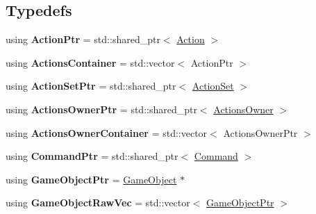 \subsection*{Typedefs}
\begin{DoxyCompactItemize}
\item 
\hypertarget{namespaceDCEngine_afb966e132a34bf8f735f7382592117c1}{using {\bfseries Action\-Ptr} = std\-::shared\-\_\-ptr$<$ \hyperlink{classDCEngine_1_1Action}{Action} $>$}\label{namespaceDCEngine_afb966e132a34bf8f735f7382592117c1}

\item 
\hypertarget{namespaceDCEngine_a185d16db9db10ab7dcc13f235b6084b6}{using {\bfseries Actions\-Container} = std\-::vector$<$ Action\-Ptr $>$}\label{namespaceDCEngine_a185d16db9db10ab7dcc13f235b6084b6}

\item 
\hypertarget{namespaceDCEngine_a0d17ef7ea7367db86a884ce6a80bd3d4}{using {\bfseries Action\-Set\-Ptr} = std\-::shared\-\_\-ptr$<$ \hyperlink{classDCEngine_1_1ActionSet}{Action\-Set} $>$}\label{namespaceDCEngine_a0d17ef7ea7367db86a884ce6a80bd3d4}

\item 
\hypertarget{namespaceDCEngine_a844aaea0b902e67d8a52ee87c6fd46af}{using {\bfseries Actions\-Owner\-Ptr} = std\-::shared\-\_\-ptr$<$ \hyperlink{classDCEngine_1_1ActionsOwner}{Actions\-Owner} $>$}\label{namespaceDCEngine_a844aaea0b902e67d8a52ee87c6fd46af}

\item 
\hypertarget{namespaceDCEngine_ac039be23ffd8c568541fa61a2f0a615e}{using {\bfseries Actions\-Owner\-Container} = std\-::vector$<$ Actions\-Owner\-Ptr $>$}\label{namespaceDCEngine_ac039be23ffd8c568541fa61a2f0a615e}

\item 
\hypertarget{namespaceDCEngine_a0b369931802e2018ee1f083dd2ea426c}{using {\bfseries Command\-Ptr} = std\-::shared\-\_\-ptr$<$ \hyperlink{classDCEngine_1_1Command}{Command} $>$}\label{namespaceDCEngine_a0b369931802e2018ee1f083dd2ea426c}

\item 
\hypertarget{namespaceDCEngine_a79a8be802832f343d6b0ae7178f6b5a7}{using {\bfseries Game\-Object\-Ptr} = \hyperlink{classDCEngine_1_1GameObject}{Game\-Object} $\ast$}\label{namespaceDCEngine_a79a8be802832f343d6b0ae7178f6b5a7}

\item 
\hypertarget{namespaceDCEngine_a543d3c0e1e3db988bd5c48c1e12f5ad9}{using {\bfseries Game\-Object\-Raw\-Vec} = std\-::vector$<$ \hyperlink{classDCEngine_1_1GameObject}{Game\-Object\-Ptr} $>$}\label{namespaceDCEngine_a543d3c0e1e3db988bd5c48c1e12f5ad9}


\end{DoxyCompactItemize}
